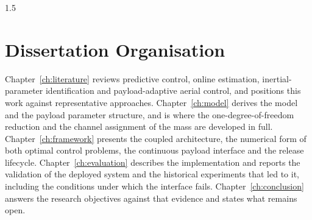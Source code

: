 \begin{spacing}{1.5}
\section{Dissertation Organisation}

Chapter~\ref{ch:literature} reviews predictive control, online estimation,
inertial-parameter identification and payload-adaptive aerial control, and
positions this work against representative approaches.
Chapter~\ref{ch:model} derives the model and the payload parameter structure, and
is where the one-degree-of-freedom reduction and the channel assignment of the
mass are developed in full.
Chapter~\ref{ch:framework} presents the coupled architecture, the numerical form
of both optimal control problems, the continuous payload interface and the
release lifecycle. Chapter~\ref{ch:evaluation} describes the implementation and
reports the validation of the deployed system and the historical experiments
that led to it, including the conditions under which
the interface fails. Chapter~\ref{ch:conclusion} answers the research objectives
against that evidence and states what remains open.

\end{spacing}
\newpage
